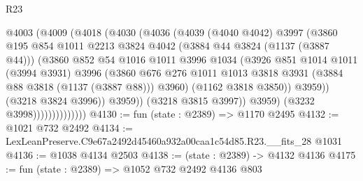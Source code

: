 \begin{lexlean}{R23}
\begin{coremodule}
                            @4003
                              (@4009
                                (@4018
                                  (@4030
                                    (@4036
                                      (@4039
                                        (@4040 @4042)
                                        @3997
                                        (@3860
                                          @195
                                          @854
                                          @1011
                                          @2213
                                          @3824
                                          @4042
                                          (@3884 @44 @3824 (@1137 (@3887 @44)))
                                          (@3860
                                            @852
                                            @54
                                            @1016
                                            @1011
                                            @3996
                                            @1034
                                            (@3926
                                              @851
                                              @1014
                                              @1011
                                              (@3994 @3931)
                                              @3996
                                              (@3860
                                                @676
                                                @276
                                                @1011
                                                @1013
                                                @3818
                                                @3931
                                                (@3884 @88 @3818 (@1137 (@3887 @88)))
                                                @3960)
                                              (@1162 @3818 @3850))
                                            @3959))
                                        (@3218 @3824 @3996))
                                      @3959))
                                  (@3218 @3815 @3997))
                                @3959)
                              (@3232 @3998))))))))))))))
@4130 := fun (state : @2389) => @1170 @2495
@4132 := @1021 @732 @2492
@4134 := LexLeanPreserve.C9e67a2492d45460a932a00caa1c54d85.R23.__fits_28 @1031
@4136 := @1038 @4134 @2503
@4138 := (state : @2389) -> @4132 @4136
@4175 := fun (state : @2389) =>
  @1052
    @732
    @2492
    @4136
    @803

\end{coremodule}
\end{lexlean}
